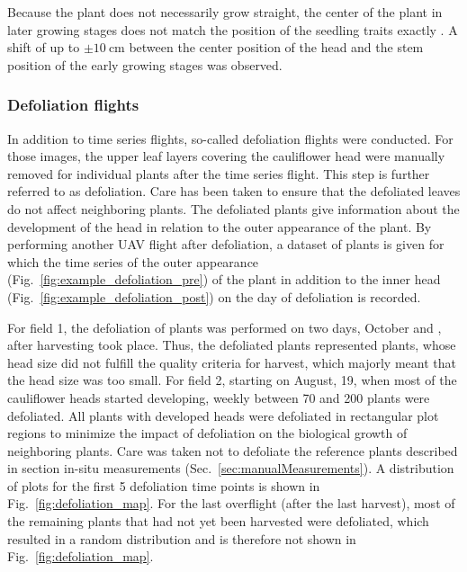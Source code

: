 \documentclass{article}
\def\secref#1{Sec.~\ref{#1}}
\def\figref#1{Fig.~\ref{#1}}
\begin{document}
Because the plant does not necessarily grow straight, the center of the plant in later growing stages does not match the position of the seedling traits exactly \citep{grenzdorffer2019automatic}. A shift of up to $\pm \SI{10}{\centi\meter}$ between the center position of the head and the stem position of the early growing stages was observed.

\subsubsection{Defoliation flights}
In addition to time series flights, so-called defoliation flights were conducted. For those images, the upper leaf layers covering the cauliflower head were manually removed for individual plants after the time series flight. This step is further referred to as defoliation. Care has been taken to ensure that the defoliated leaves do not affect neighboring plants. The defoliated plants give information about the development of the head in relation to the outer appearance of the plant. By performing another UAV flight after defoliation, a dataset of plants is given for which the time series of the outer appearance (\figref{fig:example_defoliation_pre}) of the plant in addition to the inner head (\figref{fig:example_defoliation_post}) on the day of defoliation is recorded.

For field 1, the defoliation of plants was performed on two days, October  and , after harvesting took place. Thus, the defoliated plants represented plants, whose head size did not fulfill the quality criteria for harvest, which majorly meant that the head size was too small.
For field 2, starting on August, 19, when most of the cauliflower heads started developing, weekly between 70 and 200 plants were defoliated. All plants with developed heads were defoliated in rectangular plot regions to minimize the impact of defoliation on the biological growth of neighboring plants.
Care was taken not to defoliate the reference plants described in section in-situ measurements (\secref{sec:manualMeasurements}).
A distribution of plots for the first 5 defoliation time points is shown in \figref{fig:defoliation_map}. 
For the last overflight (after the last harvest), most of the remaining plants that had not yet been harvested were defoliated, which resulted in a random distribution and is therefore not shown in \figref{fig:defoliation_map}.
\end{document}
